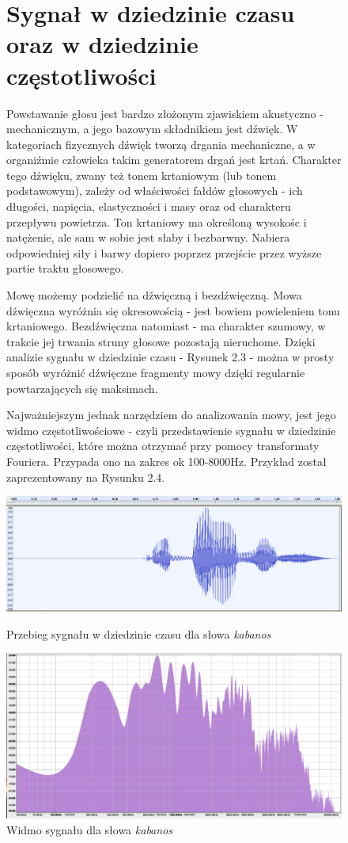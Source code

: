 \documentclass[eng,printmode]{mgr}
\begin{document}
\begin{figure}
 	\section{Sygnał w dziedzinie czasu oraz w dziedzinie częstotliwości}
	Powstawanie głosu jest bardzo złożonym zjawiskiem akustyczno - mechanicznym, a jego bazowym składnikiem jest dźwięk. W kategoriach fizycznych dźwięk tworzą drgania mechaniczne, a w organiźmie człowieka takim generatorem drgań jest krtań. Charakter tego dźwięku, zwany też tonem krtaniowym (lub tonem podstawowym), zależy od właściwości fałdów głosowych - ich długości, napięcia, elastyczności i masy oraz od charakteru przepływu powietrza. Ton krtaniowy ma określoną wysokośc i natężenie, ale sam w sobie jest słaby i bezbarwny. Nabiera odpowiedniej siły i barwy dopiero poprzez przejście przez wyższe partie traktu głosowego.
	
	 Mowę możemy podzielić na dźwięczną i bezdźwięczną. Mowa dźwięczna wyróżnia się okresowością - jest bowiem powieleniem tonu krtaniowego. Bezdźwięczna natomiast - ma charakter szumowy, w trakcie jej trwania struny głosowe pozostają nieruchome. Dzięki analizie sygnału w dziedzinie czasu - Rysunek 2.3 - można w prosty sposób wyróżnić dźwięczne fragmenty mowy dzięki regularnie powtarzających się maksimach. 
	 
	 Najważniejszym jednak narzędziem do analizowania mowy, jest jego widmo częstotliwościowe - czyli przedstawienie sygnału w dziedzinie częstotliwości, które można otrzymać przy pomocy transformaty Fouriera. Przypada ono na zakres ok 100-8000Hz. Przykład został zaprezentowany na Rysunku 2.4.
 	\begin{center}
 		\includegraphics[scale=0.3]{kabanosTime.png}
 		\caption{Przebieg sygnału w dziedzinie czasu dla słowa \emph{kabanos}}\vspace{5mm}
 		
 		\includegraphics[scale=0.5]{kabanosSpectrum.png}
 		\caption{Widmo sygnału dla słowa \emph{kabanos}}\vspace{5mm}
 	\end{center}
\end{figure}
  
\end{document}

